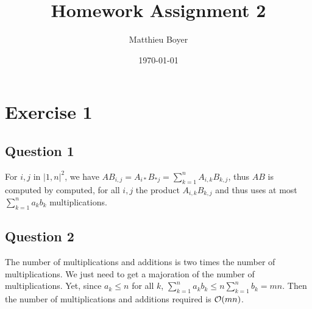 \documentclass{Cours}
\date{\today}
\author{Matthieu Boyer}
\title{Homework Assignment 2}
\begin{document}
    \section{Exercise 1}
        \subsection{Question 1}
            For $i, j$ in $\lvert 1, n \rvert^{2}$, we have $AB_{i, j} = A_{i*}B_{*j} = \sum_{k = 1}^{n} A_{i, k}B_{k, j}$, thus $AB$ is computed by computed, for all $i, j$ the product $A_{i,k}B_{k,j}$ and thus uses at most $\sum_{k = 1}^{n} a_{k}b_{k}$ multiplications.

        \subsection{Question 2}
            The number of multiplications and additions is two times the number of multiplications. We just need to get a majoration of the number of multiplications. Yet, since $a_{k} \leq n$ for all $k$, $\sum_{k = 1}^{n} a_{k} b_{k} \leq n \sum_{k=1}^{n}b_{k} = mn$. Then the number of multiplications and additions required is $\mathcal{O}(mn)$.
\end{document}
